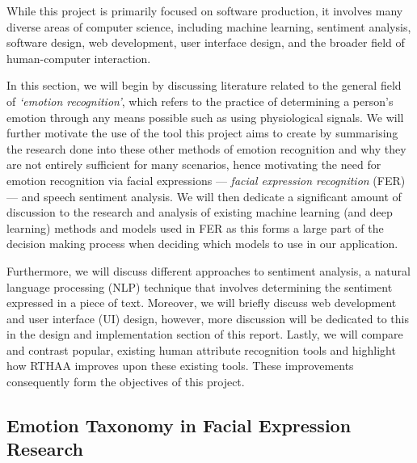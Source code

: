 \documentclass[12pt, a4paper]{article}
\newcommand{\np}
    {
    \vskip 0.4cm
    }
\begin{document}
While this project is primarily focused on software production, it involves many diverse areas of computer science, including machine learning, sentiment analysis, software design, web development, user interface design, and the broader field of human-computer interaction.
\np
In this section, we will begin by discussing literature related to the general field of \textit{`emotion recognition'}, which refers to the practice of determining a person's emotion through any means possible such as using physiological signals. We will further motivate the use of the tool this project aims to create by summarising the research done into these other methods of emotion recognition and why they are not entirely sufficient for many scenarios, hence motivating the need for emotion recognition via facial expressions --- \textit{facial expression recognition} (FER) --- and speech sentiment analysis. We will then dedicate a significant amount of discussion to the research and analysis of existing machine learning (and deep learning) methods and models used in FER as this forms a large part of the decision making process when deciding which models to use in our application.
\np
Furthermore, we will discuss different approaches to sentiment analysis, a natural language processing (NLP) technique that involves determining the sentiment expressed in a piece of text. Moreover, we will briefly discuss web development and user interface (UI) design, however, more discussion will be dedicated to this in the design and implementation section of this report. Lastly, we will compare and contrast popular, existing human attribute recognition tools and highlight how RTHAA improves upon these existing tools. These improvements consequently form the objectives of this project.

\subsection{Emotion Taxonomy in Facial Expression Research}
\end{document}
